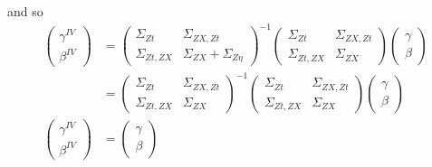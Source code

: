 \documentclass[10pt]{article}
\makeatletter
\renewenvironment{proof}[1][\proofname] {\par\pushQED{\qed}\normalfont\topsep6\p@\@plus6\p@\relax\trivlist\item[\hskip\labelsep\bfseries#1\@addpunct{.}]\ignorespaces}{\popQED\endtrivlist\@endpefalse}
\makeatother
\begin{document}
\begin{proof}
                and so
                \begin{align*}
                    \left(\begin{array}{l}
                {\gamma}^{IV} \\
                {\beta}^{IV}
                \end{array}\right)
                & =\left(\begin{array}{cc}
                {\Sigma}_{Zt} & \Sigma_{ZX,Zt} \\
                \Sigma_{Zt,ZX}& {\Sigma}_{ZX}+{\Sigma}_{Z\eta}
                \end{array}\right)^{-1}\left(\begin{array}{cc}
                {\Sigma}_{Zt} & \Sigma_{ZX,Zt} \\
                \Sigma_{Zt,ZX} & {\Sigma}_{ZX}
                \end{array}\right)\left(\begin{array}{l}
                {\gamma} \\
                {\beta}
                \end{array}\right)\\
                & =\left(\begin{array}{cc}
                {\Sigma}_{Zt} & \Sigma_{ZX,Zt} \\
                \Sigma_{Zt,ZX}& {\Sigma}_{ZX}
                \end{array}\right)^{-1}\left(\begin{array}{cc}
                {\Sigma}_{Zt} & \Sigma_{ZX,Zt} \\
                \Sigma_{Zt,ZX} & {\Sigma}_{ZX}
                \end{array}\right)\left(\begin{array}{l}
                {\gamma} \\
                {\beta}
                \end{array}\right) \\
                \left(\begin{array}{l}
                {\gamma}^{IV} \\
                {\beta}^{IV}
                \end{array}\right)
                & =\left(\begin{array}{l}
                {\gamma} \\
                {\beta}
                \end{array}\right)
                \end{align*}
                

\end{proof}
\end{document}
